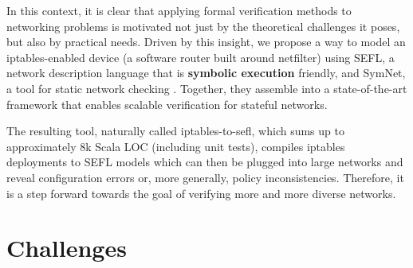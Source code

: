 In this context, it is clear that applying formal verification methods to
networking problems is motivated not just by the theoretical challenges it
poses, but also by practical needs.  Driven by this insight, we propose a way
to model an iptables-enabled device (a software router built around netfilter)
using SEFL, a network
description language that is \textbf{symbolic execution} friendly, and SymNet,
a tool for static network checking \cite{stoenescu2016symnet,
stoenescu2013symnet}.  Together, they assemble into a state-of-the-art
framework that enables scalable verification for stateful networks.

The resulting tool, naturally called iptables-to-sefl, which sums up to
approximately 8k Scala LOC (including unit tests), compiles iptables
deployments to SEFL models which can then be plugged into large networks and
reveal configuration errors or, more generally, policy inconsistencies.
Therefore, it is a step forward towards the goal of verifying more and more
diverse networks.

\section{Challenges}
